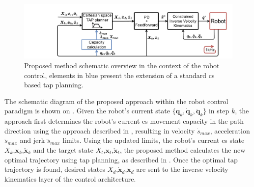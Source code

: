 \begin{figure}[!h]
    \centering
    \includegraphics[trim=3.5cm 0 0 0, clip=true, width=\linewidth]{Papers/imgs/schema.pdf}
    \caption{Proposed method schematic overview in the context of the robot control, elements in blue present the extension of a standard \gls{cs} based \gls{tap} planning.}
    \label{fig:schema}
\end{figure}

The schematic diagram of the proposed approach within the robot control paradigm is shown on . Given the robot's current state $\{\bm{q}_k,\dot{\bm{q}}_k,\ddot{\bm{q}}_k\}$ in step $k$, the approach first determines the robot's current \gls{cs} movement capacity in the path direction using the approach described in , resulting in velocity $\dot{s}_{max}$, acceleration $\ddot{s}_{max}$ and jerk $\dddot{s}_{max}$ limits. Using the updated limits, the robot's current \gls{cs} state $X_k$,$\dot{\bm{x}}_k$,$\ddot{\bm{x}}_k$ and the target state $X_t$,$\dot{\bm{x}}_t$,$\ddot{\bm{x}}_t$,
the proposed method calculates the new optimal trajectory using \gls{tap} planning, as described in .
Once the optimal \gls{tap} trajectory is found, desired states $X_{d}$,$\dot{\bm{x}}_d$,$\ddot{\bm{x}}_d$ are sent to the inverse velocity kinematics layer of the control architecture. 

